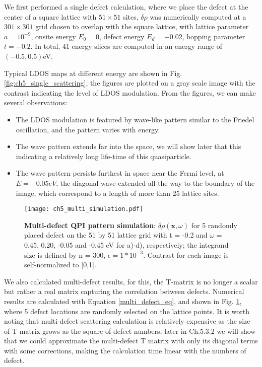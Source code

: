 We first performed a single defect calculation, where we place the defect at the center of a square lattice with $51\times51$ sites, $\delta\rho$ was numerically computed at a $301\times301$ grid chosen to overlap with the square lattice, with lattice parameter $a = 10^{-9}$, onsite energy $E_0 = 0$, defect energy $E_d=-0.02$, hopping parameter $t = -0.2$. In total, 41 energy slices are computed in an energy range of $(-0.5, 0.5)$eV.  

Typical \ac{LDOS} maps at different energy are shown in Fig. \ref{fig:ch5_single_scattering}, the figures are plotted on a gray scale image with the contrast indicating the level of \ac{LDOS} modulation. From the figures, we can make several observations:
\begin{itemize}
	\item The \ac{LDOS} modulation is featured by wave-like pattern similar to the Friedel oscillation, and the pattern varies with energy. 
	\item The wave pattern extends far into the space, we will show later that this indicating a relatively long life-time of this quasiparticle. 
	\item The wave pattern persists furthest in space near the Fermi level, at $E=-0.05eV$, the diagonal wave extended all the way to the boundary of the image, which correspond to a length of more than 25 lattice sites. 
\end{itemize}



\begin{figure}
	\centering
	\texttt{[image: ch5\_multi\_simulation.pdf]} 
	\caption[\textbf{Multi-defect QPI pattern simulation}]{\textbf{Multi-defect QPI pattern simulation}: $\delta\rho(\textbf{x},\omega)$ for 5 randomly placed defect on the 51 by 51 lattice grid with t = -0.2 and $\omega$ = 0.45, 0.20, -0.05 and -0.45 eV for a)-d), respectively; the integrand size is defined by n = 300, $\epsilon = 1*10^{-3}$. Contrast for each image is self-normalized to [0,1].}
	\label{fig:ch5_multi_scattering}
\end{figure}

We also calculated multi-defect results, for this, the T-matrix is no longer a scalar but rather a real matrix capturing the correlation between defects. Numerical results are calculated with Equation \ref{multi_defect_eq}, and shown in Fig. \ref{fig:ch5_multi_scattering}, where 5 defect locations are randomly selected on the lattice points. It is worth noting that multi-defect scattering calculation is relatively expensive as the size of T matrix grows as the square of defect numbers, later in Ch.5.3.2 we will show that we could approximate the multi-defect T matrix with only its diagonal terms with some corrections, making the calculation time linear with the numbers of defect.  



